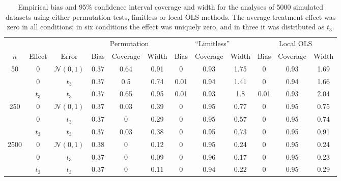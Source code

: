 
\begin{table}
\footnotesize
\begin{tabular}{ccc|ccc|ccc|ccc}
\hline

&&& \multicolumn{ 3 }{c}{Permutation}&\multicolumn{ 3 }{c}{``Limitless''}&\multicolumn{ 3 }{c}{Local OLS}\\
$n$& Effect& Error & Bias&Coverage&Width&Bias&Coverage&Width&Bias&Coverage&Width \\
\hline 
\hline 
\multirow{3}{*}{ 50 } &0& $\mathcal{N}(0,1)$ &0.37&0.64&0.91&0&0.93&1.75&0&0.93&1.69 \\ 
 &  0 & $t_3$ &0.37&0.5&0.74&0.01&0.94&1.41&0&0.94&1.66 \\ 
 &  $t_3$ & $t_3$ &0.37&0.65&0.95&0.01&0.93&1.8&0.01&0.93&2.04 \\ 
\hline 
\multirow{3}{*}{ 250 } &0& $\mathcal{N}(0,1)$ &0.37&0.03&0.39&0&0.95&0.77&0&0.95&0.75 \\ 
 &  0 & $t_3$ &0.37&0&0.29&0&0.95&0.57&0&0.95&0.74 \\ 
 &  $t_3$ & $t_3$ &0.37&0.03&0.38&0&0.95&0.73&0&0.95&0.91 \\ 
\hline 
\multirow{3}{*}{ 2500 } &0& $\mathcal{N}(0,1)$ &0.38&0&0.12&0&0.95&0.24&0&0.95&0.24 \\ 
 &  0 & $t_3$ &0.37&0&0.09&0&0.96&0.17&0&0.95&0.23 \\ 
 &  $t_3$ & $t_3$ &0.37&0&0.11&0&0.94&0.22&0&0.95&0.29 \\ 
\hline
\end{tabular}
  \caption{Empirical bias and 95\% confidence interval coverage and width for the analyses of  5000 simulated datasets using either permutation tests, limitless or local OLS methods. The average treatment effect was zero in all conditions; in six conditions the effect was uniquely zero, and in three it was distributed as $t_3$.}
  \label{tab:level}
\end{table}
